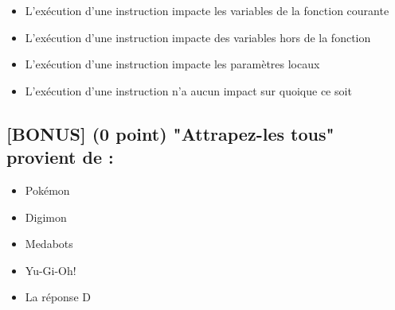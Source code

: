 \documentclass[11pt,a4paper]{article}
\begin{document}
\begin{itemize}
  \item[\CaseCoche] L'exécution d'une instruction impacte les variables de la fonction courante \\
  \item[\checkmark] L'exécution d'une instruction impacte des variables hors de la fonction \\ %
  \item[\CaseCoche] L'exécution d'une instruction impacte les paramètres locaux \\
  \item[\CaseCoche] L'exécution d'une instruction n'a aucun impact sur quoique ce soit \\
\end{itemize}


\bigskip


\subsection{[BONUS] (0 point) "Attrapez-les tous" provient de : }

\begin{itemize}
  \item[\checkmark] Pokémon \\ %
  \item[\CaseCoche] Digimon \\
  \item[\CaseCoche] Medabots \\
  \item[\CaseCoche] Yu-Gi-Oh! \\
  \item[\CaseCoche] La réponse D \\
\end{itemize}
\end{document}
